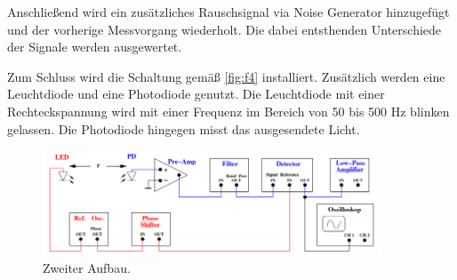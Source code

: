 \noindent Anschließend wird ein zusätzliches Rauschsignal via Noise Generator 
hinzugefügt und der vorherige Messvorgang wiederholt. Die dabei entsthenden 
Unterschiede der Signale werden ausgewertet.
\par\vspace{0.5em}
\noindent Zum Schluss wird die Schaltung gemäß \autoref{fig:f4} installiert.
Zusätzlich werden eine Leuchtdiode und eine Photodiode genutzt.
Die Leuchtdiode mit einer Rechteckspannung wird mit einer Frequenz im Bereich 
von 50 bis 500 Hz blinken gelassen. Die Photodiode hingegen misst das ausgesendete 
Licht.
\begin{figure}[H]
    \centering
        \centering
        \includegraphics[width=0.9\textwidth]{Bilder/baute2.png}
        \caption{Zweiter Aufbau. \cite{anleitung2}}
    \hfill
    \label{fig:f4}
\end{figure}